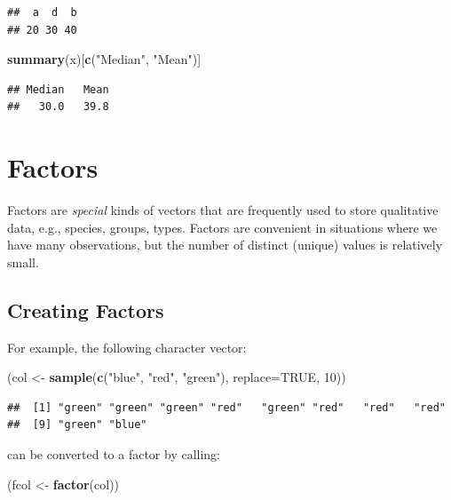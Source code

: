 \documentclass[10pt,b5paper,krantz1]{krantz}
\newenvironment{Shaded}{\begin{snugshade}}{\end{snugshade}}
\newcommand{\DataTypeTok}[1]{\textcolor[rgb]{0.27,0.27,0.27}{#1}}
\newcommand{\DecValTok}[1]{\textcolor[rgb]{0.06,0.06,0.06}{#1}}
\newcommand{\KeywordTok}[1]{\textcolor[rgb]{0.27,0.27,0.27}{\textbf{#1}}}
\newcommand{\NormalTok}[1]{#1}
\newcommand{\OtherTok}[1]{\textcolor[rgb]{0.37,0.37,0.37}{#1}}
\newcommand{\StringTok}[1]{\textcolor[rgb]{0.5,0.5,0.5}{#1}}
\begin{document}
\begin{verbatim}
##  a  d  b 
## 20 30 40
\end{verbatim}

\begin{Shaded}
\begin{Highlighting}[]
\KeywordTok{summary}\NormalTok{(x)[}\KeywordTok{c}\NormalTok{(}\StringTok{"Median"}\NormalTok{, }\StringTok{"Mean"}\NormalTok{)]}
\end{Highlighting}
\end{Shaded}

\begin{verbatim}
## Median   Mean 
##   30.0   39.8
\end{verbatim}

\hypertarget{factors}{%
\section{Factors}\label{factors}}

Factors are \emph{special} kinds of vectors that are frequently used to
store qualitative data, e.g., species, groups, types.
Factors are convenient in situations where we have many observations,
but the number
of distinct (unique) values is relatively small.

\hypertarget{creating-factors}{%
\subsection{Creating Factors}\label{creating-factors}}

For example, the following character vector:

\begin{Shaded}
\begin{Highlighting}[]
\NormalTok{(col <-}\StringTok{ }\KeywordTok{sample}\NormalTok{(}\KeywordTok{c}\NormalTok{(}\StringTok{"blue"}\NormalTok{, }\StringTok{"red"}\NormalTok{, }\StringTok{"green"}\NormalTok{), }\DataTypeTok{replace=}\OtherTok{TRUE}\NormalTok{, }\DecValTok{10}\NormalTok{))}
\end{Highlighting}
\end{Shaded}

\begin{verbatim}
##  [1] "green" "green" "green" "red"   "green" "red"   "red"   "red"  
##  [9] "green" "blue"
\end{verbatim}

can be converted to a factor by calling:

\begin{Shaded}
\begin{Highlighting}[]
\NormalTok{(fcol <-}\StringTok{ }\KeywordTok{factor}\NormalTok{(col))}
\end{Highlighting}
\end{Shaded}
\end{document}
